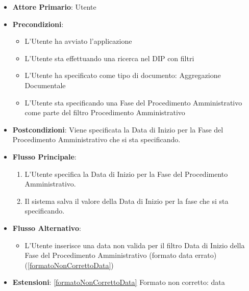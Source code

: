 \begin{itemize}
      \item \textbf{Attore Primario}: Utente
      \item \textbf{Precondizioni}: 
      \begin{itemize}
            \item L'Utente ha avviato l'applicazione
            \item L'Utente sta effettuando una ricerca nel DIP con filtri
            \item L'Utente ha specificato come tipo di documento: Aggregazione Documentale
            \item L'Utente sta specificando una Fase del Procedimento Amministrativo come parte del filtro Procedimento Amministrativo
      \end{itemize}
      \item \textbf{Postcondizioni}: Viene specificata la Data di Inizio per la Fase del Procedimento Amministrativo che si sta specificando.
      \item \textbf{Flusso Principale}:
      \begin{enumerate}
            \item L'Utente specifica la Data di Inizio per la Fase del Procedimento Amministrativo.
            \item Il sistema salva il valore della Data di Inizio per la fase che si sta specificando.
      \end{enumerate}
      \item \textbf{Flusso Alternativo}:
      \begin{itemize}
            \item L'Utente inserisce una data non valida per il filtro Data di Inizio della Fase del Procedimento Amministrativo (formato data errato) (\ref{formatoNonCorrettoData})
      \end{itemize}
      \item \textbf{Estensioni}: \ref{formatoNonCorrettoData} Formato non corretto: data
\end{itemize}

